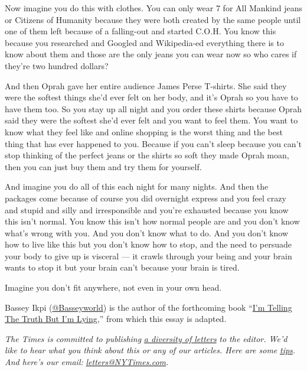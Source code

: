 Now imagine you do this with clothes. You can only wear 7 for All
Mankind jeans or Citizens of Humanity because they were both created by
the same people until one of them left because of a falling-out and
started C.O.H. You know this because you researched and Googled and
Wikipedia-ed everything there is to know about them and those are the
only jeans you can wear now so who cares if they're two hundred dollars?

And then Oprah gave her entire audience James Perse T-shirts. She said
they were the softest things she'd ever felt on her body, and it's Oprah
so you have to have them too. So you stay up all night and you order
these shirts because Oprah said they were the softest she'd ever felt
and you want to feel them. You want to know what they feel like and
online shopping is the worst thing and the best thing that has ever
happened to you. Because if you can't sleep because you can't stop
thinking of the perfect jeans or the shirts so soft they made Oprah
moan, then you can just buy them and try them for yourself.

And imagine you do all of this each night for many nights. And then the
packages come because of course you did overnight express and you feel
crazy and stupid and silly and irresponsible and you're exhausted
because you know this isn't normal. You know this isn't how normal
people are and you don't know what's wrong with you. And you don't know
what to do. And you don't know how to live like this but you don't know
how to stop, and the need to persuade your body to give up is visceral
--- it crawls through your being and your brain wants to stop it but
your brain can't because your brain is tired.

Imagine you don't fit anywhere, not even in your own head.

Bassey Ikpi (\href{https://twitter.com/Basseyworld}{@Basseyworld}) is
the author of the forthcoming book
``\href{https://www.harpercollins.com/9780062698346/im-telling-the-truth-but-im-lying/}{I'm
Telling The Truth But I'm Lying},'' from which this essay is adapted.

\emph{The Times is committed to publishing}
\href{https://www.nytimes3xbfgragh.onion/2019/01/31/opinion/letters/letters-to-editor-new-york-times-women.html}{\emph{a
diversity of letters}} \emph{to the editor. We'd like to hear what you
think about this or any of our articles. Here are some}
\href{https://help.nytimes3xbfgragh.onion/hc/en-us/articles/115014925288-How-to-submit-a-letter-to-the-editor}{\emph{tips}}\emph{.
And here's our email:}
\href{mailto:letters@NYTimes.com}{\emph{letters@NYTimes.com}}\emph{.}

